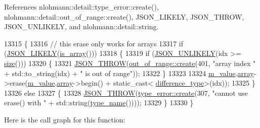 References nlohmann\+::detail\+::type\+\_\+error\+::create(), nlohmann\+::detail\+::out\+\_\+of\+\_\+range\+::create(), J\+S\+O\+N\+\_\+\+L\+I\+K\+E\+LY, J\+S\+O\+N\+\_\+\+T\+H\+R\+OW, J\+S\+O\+N\+\_\+\+U\+N\+L\+I\+K\+E\+LY, and nlohmann\+::detail\+::string.


\begin{DoxyCode}
13315     \{
13316         \textcolor{comment}{// this erase only works for arrays}
13317         \textcolor{keywordflow}{if} (\hyperlink{json_8hpp_a41ecd1c4cf7c3d56477b9b685b5daa72}{JSON\_LIKELY}(\hyperlink{classnlohmann_1_1basic__json_aef9ce5dd2381caee1f8ddcdb5bdd9c65}{is\_array}()))
13318         \{
13319             \textcolor{keywordflow}{if} (\hyperlink{json_8hpp_ab77582407c64944e7db1ea95ab520253}{JSON\_UNLIKELY}(idx >= \hyperlink{classnlohmann_1_1basic__json_a25e27ad0c6d53c01871c5485e1f75b96}{size}()))
13320             \{
13321                 \hyperlink{json_8hpp_a6c274f6db2e65c1b66c7d41b06ad690f}{JSON\_THROW}(\hyperlink{classnlohmann_1_1detail_1_1out__of__range_a3f6d82a6f967c4728a1ec735a7867073}{out\_of\_range::create}(401, \textcolor{stringliteral}{"array index "} + 
      std::to\_string(idx) + \textcolor{stringliteral}{" is out of range"}));
13322             \}
13323 
13324             \hyperlink{classnlohmann_1_1basic__json_aeb0814f76966f99290cb29e127c90a77}{m\_value}.\hyperlink{unionnlohmann_1_1basic__json_1_1json__value_a7947687f3ae1911d6e9847e2b3226157}{array}->erase(\hyperlink{classnlohmann_1_1basic__json_aeb0814f76966f99290cb29e127c90a77}{m\_value}.\hyperlink{unionnlohmann_1_1basic__json_1_1json__value_a7947687f3ae1911d6e9847e2b3226157}{array}->begin() + \textcolor{keyword}{static\_cast<}
      \hyperlink{classnlohmann_1_1basic__json_afe7c1303357e19cea9527af4e9a31d8f}{difference\_type}\textcolor{keyword}{>}(idx));
13325         \}
13326         \textcolor{keywordflow}{else}
13327         \{
13328             \hyperlink{json_8hpp_a6c274f6db2e65c1b66c7d41b06ad690f}{JSON\_THROW}(\hyperlink{classnlohmann_1_1detail_1_1type__error_aecc083aea4b698c33d042670ba50c10f}{type\_error::create}(307, \textcolor{stringliteral}{"cannot use erase() with "} + 
      std::string(\hyperlink{classnlohmann_1_1basic__json_a9d0a478571f82f0163b96b2424cd998f}{type\_name}())));
13329         \}
13330     \}
\end{DoxyCode}
Here is the call graph for this function\+:
\mbox{\label{classnlohmann_1_1basic__json_a89eb3928f57903677051c80534be9cb1}} 
